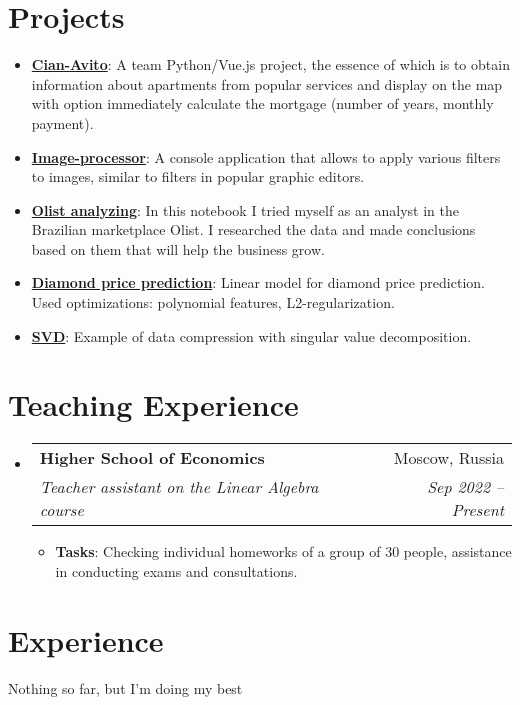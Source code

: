 \documentclass{resume}
\makeatletter
\newcommand{\resumeItem}[2]{
  \item\small{
    \textbf{#1}{: #2 \vspace{-2pt}}
  }
}
\newcommand{\resumeSubheading}[4]{
  \vspace{-1pt}\item
    \begin{tabular*}{0.97\textwidth}[t]{l@{\extracolsep{\fill}}r}
      \textbf{#1} & #2 \\
      \textit{\small#3} & \textit{\small #4} \\
    \end{tabular*}\vspace{-5pt}
}
\newcommand{\resumeSubItem}[2]{\resumeItem{#1}{#2}\vspace{-4pt}}
\newcommand{\resumeSubHeadingListStart}{\begin{itemize}[leftmargin=*]}
\newcommand{\resumeSubHeadingListEnd}{\end{itemize}}
\newcommand{\resumeItemListStart}{\begin{itemize}}
\newcommand{\resumeItemListEnd}{\end{itemize}\vspace{-5pt}}
\makeatother
\begin{document}
\section{Projects}
  \resumeSubHeadingListStart
    \resumeSubItem{\href{https://github.com/free001style/Cian_Avito_project}{Cian-Avito}}
      {A team Python/Vue.js project, the essence of which is to obtain information about apartments from popular services and display on the map with option immediately calculate the mortgage (number of years, monthly payment).}
      \bigskip
    \resumeSubItem{\href{https://github.com/free001style/image_processor}{Image-processor}}
      {A console application that allows to apply various filters to images, similar to filters in popular graphic editors.}
      \bigskip
     \resumeSubItem{\href{https://github.com/free001style/Deep_Python-HSE/blob/main/HW-1_data_analysis/Drobyshevskiy_Ilya_HW_1_data_analysis.ipynb}{Olist analyzing}}
      {In this notebook I tried myself as an analyst in the Brazilian marketplace Olist. I researched the data and made conclusions based on them that will help the business grow.}
      \bigskip
    \resumeSubItem{\href{https://github.com/free001style/LinearAlgebra-HSE/blob/main/homework-practice-02-linregr-Drobyshevskiy.ipynb}{Diamond price prediction}}
      {Linear model for diamond price prediction. Used optimizations: polynomial features, L2-regularization.}
      \bigskip
    \resumeSubItem{\href{https://github.com/free001style/LinearAlgebra-HSE/blob/main/homework_practice_03_linregr.ipynb}{SVD}}
      {Example of data compression with singular value decomposition.}
    
  \resumeSubHeadingListEnd


\section{Teaching Experience}
\resumeSubHeadingListStart
    \resumeSubheading
      {Higher School of Economics}{Moscow, Russia}
      {Teacher assistant on the Linear Algebra course}{Sep 2022 -- Present}
      \resumeItemListStart
      \medskip
      \resumeItem{Tasks} {Checking individual homeworks of a group of 30 people, assistance in conducting exams and consultations.}
      \resumeItemListEnd
  \resumeSubHeadingListEnd




\section{Experience}
Nothing so far, but I'm doing my best
\end{document}
